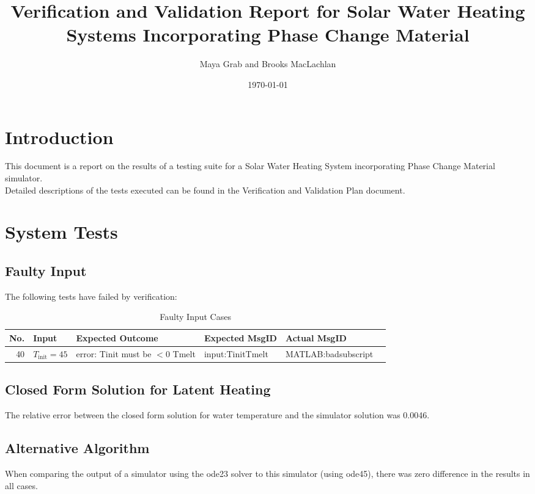 \documentclass[12pt]{article}
\begin{document}
\title{Verification and Validation Report for Solar Water Heating Systems
  Incorporating Phase Change Material} 
\author{Maya Grab and Brooks MacLachlan}
\date{\today}
	
\maketitle

\tableofcontents

\section{Introduction}
This document is a report on the results of a testing suite for a Solar Water 
Heating System incorporating Phase Change Material simulator.
\\Detailed descriptions of the tests executed can be found in the Verification 
and Validation Plan document.

\section{System Tests}

\subsection{Faulty Input}
The following tests have failed by verification:

\begin{center}
	\begin{longtable}{ | r | p{3cm} | p{4cm} | p{4cm} | p{4cm} | p{4cm}|}
	\caption{Faulty Input Cases} \\ \hline \label{TblInputVar} 
	No. & Input & Expected Outcome & Expected MsgID & Actual MsgID \\ \hline
	40 & $T_{\text{init}} = 45$ &error: Tinit must be $< 0$ Tmelt & input:TinitTmelt & MATLAB:badsubscript \\ \hline
	\end{longtable}
\end{center}

\subsection{Closed Form Solution for Latent Heating}
The relative error between the closed form solution for water temperature and the simulator solution was 0.0046.

\subsection{Alternative Algorithm}
When comparing the output of a simulator using the ode23 solver to this simulator (using ode45), there was zero difference in the results in all cases.
\end{document}
